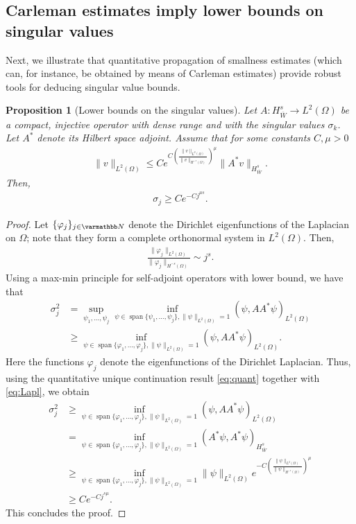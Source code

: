 \documentclass[12pt,twoside]{amsart}
\numberwithin{equation}{section}
\renewcommand{\leq}{\leqslant}
\renewcommand{\geq}{\geqslant}
\newtheorem{proposition}[theorem]{Proposition}
\DeclareMathOperator{\spa} {span}
\begin{document}
\begin{appendix}
\subsection{Carleman estimates imply lower bounds on singular values}
Next, we illustrate that quantitative propagation of smallness estimates (which can, for instance, be obtained by means of Carleman estimates) provide robust tools for deducing singular value bounds. 

\begin{proposition}[Lower bounds on the singular values]
Let $A:H^s_{\overline{W}} \rightarrow L^2(\Omega)$ be a compact, injective operator with dense range and with the singular values $\sigma_k$. Let $A^*$ denote its Hilbert space adjoint.
 Assume that for some constants $C,\mu>0$
\begin{align}
\label{eq:quant}
\|v\|_{L^2(\Omega)} \leq C e^{C \left(\frac{\|v\|_{L^2(\Omega)}}{\|v\|_{H^{-s}(\Omega)}}\right)^{\mu}}\|A^{\ast} v\|_{H^{s}_{\overline{W}}}.
\end{align}
Then, 
\begin{align*}
\sigma_j \geq C e^{-C j^{\mu s}}.
\end{align*}
\end{proposition}

\begin{proof}
Let $\{\varphi_j\}_{j\in \N}$ denote the Dirichlet eigenfunctions of the Laplacian on $\Omega$; note that they form a complete orthonormal system in $L^2(\Omega)$. Then,
\begin{align}
\label{eq:Lapl}
\frac{\|\varphi_j\|_{L^2(\Omega)}}{\|\varphi_j\|_{H^{-s}(\Omega)}} \sim j^{s}.
\end{align}
Using a max-min principle for self-adjoint operators with lower bound, 
we have that 
\begin{align*}
\sigma_j^2 &= \sup\limits_{\psi_1,\dots, \psi_j} \inf \limits_{\psi \in \spa\{\psi_1,\dots, \psi_j \}, \|\psi\|_{L^2(\Omega)}=1} (\psi, AA^{\ast} \psi)_{L^2(\Omega)}\\
&\geq  \inf\limits_{\psi \in \spa\{\varphi_1,\dots, \varphi_j \}, \|\psi\|_{L^2(\Omega)}=1} (\psi, AA^{\ast} \psi)_{L^2(\Omega)}.
\end{align*}
Here the functions $\varphi_j$ denote the eigenfunctions of the Dirichlet Laplacian. Thus, using the quantitative unique continuation result \eqref{eq:quant} together with \eqref{eq:Lapl}, we obtain
\begin{align*}
\sigma_j^2 
&\geq  \inf\limits_{\psi \in \spa\{\varphi_1,\dots, \varphi_j \}, \|\psi\|_{L^2(\Omega)}=1} (\psi, AA^{\ast} \psi)_{L^2(\Omega)}\\
&= \inf\limits_{\psi \in \spa\{\varphi_1,\dots, \varphi_j \}, \|\psi\|_{L^2(\Omega)}=1} (A^{\ast}\psi, A^{\ast} \psi)_{H^s_{\overline{W}}}\\
&\geq \inf\limits_{\psi \in \spa\{\varphi_1,\dots, \varphi_j \}, \|\psi\|_{L^2(\Omega)}=1} \|\psi\|_{L^2(\Omega)} 
e^{-C \left( \frac{\|\psi\|_{L^2(\Omega)}}{\|\psi\|_{H^{-s}(\Omega)}} \right)^{\mu}}\\
&\geq C e^{-C j^{s\mu}}.
\end{align*}
This concludes the proof.
\end{proof}



\end{appendix}
\end{document}

